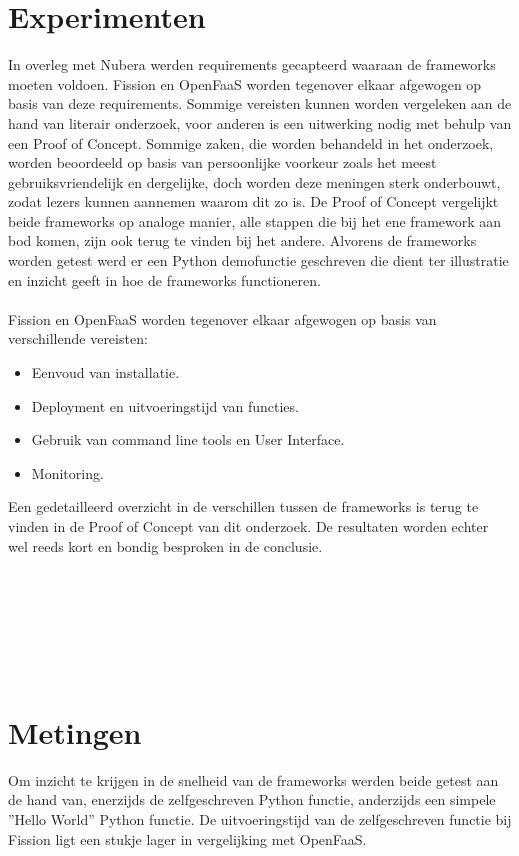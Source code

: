 \documentclass[a0,portrait]{a0poster}
\begin{document}
\begin{multicols}{2}
\color{Black} %
\color{HoGentAccent1} 
\section*{Experimenten}
\color{black}
In overleg met Nubera werden requirements gecapteerd waaraan de frameworks moeten voldoen. Fission en OpenFaaS worden tegenover elkaar afgewogen op basis van deze requirements. Sommige vereisten kunnen worden vergeleken aan de hand van literair onderzoek, voor anderen is een uitwerking nodig met behulp van een Proof of Concept. 
Sommige zaken, die worden behandeld in het onderzoek, worden beoordeeld op basis van persoonlijke voorkeur zoals het meest gebruiksvriendelijk en dergelijke, doch worden deze meningen sterk onderbouwt, zodat lezers kunnen aannemen waarom dit zo is. De Proof of Concept vergelijkt beide frameworks op analoge manier, alle stappen die bij het ene framework aan bod komen, zijn ook terug te vinden bij het andere. Alvorens de frameworks worden getest werd er een Python demofunctie geschreven die dient ter illustratie en inzicht geeft in hoe de frameworks functioneren.
\\\\
Fission en OpenFaaS worden tegenover elkaar afgewogen op basis van verschillende vereisten:
\begin{itemize}
    \item Eenvoud van installatie.
    \item Deployment en uitvoeringstijd van functies.
    \item Gebruik van command line tools en User Interface.
    \item Monitoring.\\
\end{itemize}

Een gedetailleerd overzicht in de verschillen tussen de frameworks is terug te vinden in de Proof of Concept van dit onderzoek. De resultaten worden echter wel reeds kort en bondig besproken in de conclusie.
\\\\\\\\\\\\\\
\color{HoGentAccent1} 
\section*{Metingen}
\color{black}
Om inzicht te krijgen in de snelheid van de frameworks werden beide getest aan de hand van, enerzijds de zelfgeschreven Python functie, anderzijds een simpele ''Hello World'' Python functie. De uitvoeringstijd van de zelfgeschreven functie bij Fission ligt een stukje lager in vergelijking met OpenFaaS. 


\end{multicols}
\end{document}
